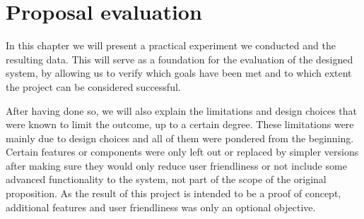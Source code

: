 \chapter{Proposal evaluation} \label{chap:eval}
In this chapter we will present a practical experiment we conducted and the resulting data.
This will serve as a foundation for the evaluation of the designed system, by allowing us to verify which goals have been met and to which extent the project can be considered successful.

After having done so, we will also explain the limitations and design choices that were known to limit the outcome, up to a certain degree.
These limitations were mainly due to design choices and all of them were pondered from the beginning.
Certain features or components were only left out or replaced by simpler versions after making sure they would only reduce user friendliness or not include some advanced functionality to the system, not part of the scope of the original proposition.
As the result of this project is intended to be a proof of concept, additional features and user friendliness was only an optional objective.








